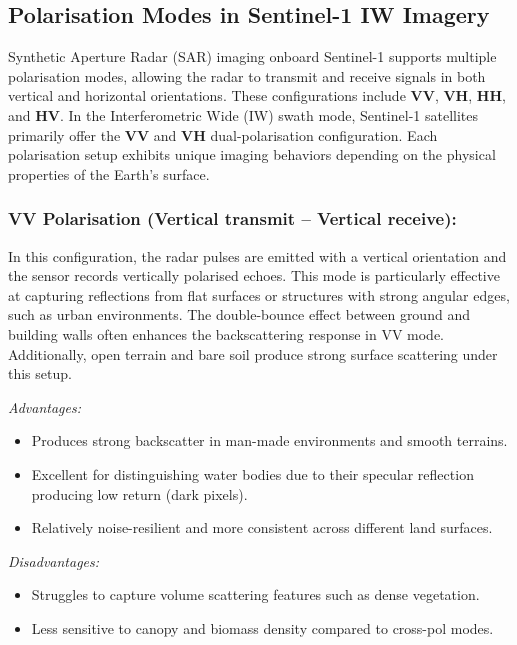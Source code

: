 \subsection{Polarisation Modes in Sentinel-1 IW Imagery}

Synthetic Aperture Radar (SAR) imaging onboard Sentinel-1 supports multiple polarisation modes, allowing the radar to transmit and receive signals in both vertical and horizontal orientations. These configurations include \textbf{VV}, \textbf{VH}, \textbf{HH}, and \textbf{HV}. In the Interferometric Wide (IW) swath mode, Sentinel-1 satellites primarily offer the \textbf{VV} and \textbf{VH} dual-polarisation configuration. Each polarisation setup exhibits unique imaging behaviors depending on the physical properties of the Earth's surface.

\subsubsection{\textbf{VV Polarisation (Vertical transmit – Vertical receive):}}

In this configuration, the radar pulses are emitted with a vertical orientation and the sensor records vertically polarised echoes. This mode is particularly effective at capturing reflections from flat surfaces or structures with strong angular edges, such as urban environments. The double-bounce effect between ground and building walls often enhances the backscattering response in VV mode. Additionally, open terrain and bare soil produce strong surface scattering under this setup.


\textit{Advantages:}
\begin{itemize}
    \item Produces strong backscatter in man-made environments and smooth terrains.
    \item Excellent for distinguishing water bodies due to their specular reflection producing low return (dark pixels).
    \item Relatively noise-resilient and more consistent across different land surfaces.
\end{itemize}

\textit{Disadvantages:}
\begin{itemize}
    \item Struggles to capture volume scattering features such as dense vegetation.
    \item Less sensitive to canopy and biomass density compared to cross-pol modes.
\end{itemize}

